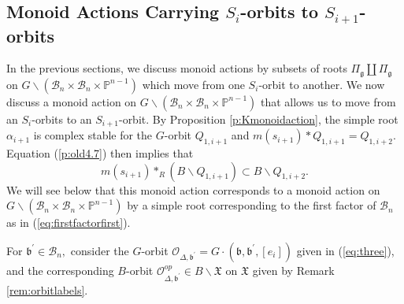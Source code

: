 \documentclass[12pt]{amsart}
\numberwithin{equation}{section}
\newtheorem{rem}[thm]{Remark}
\newcommand{\fg}{\mbox{${\mathfrak g}$}}
\newcommand{\fb}{\mbox{${\mathfrak b}$}}
\newcommand{\B}{\mathcal{B}}
\begin{document}
\subsection{Monoid Actions Carrying $S_{i}$-orbits to $S_{i+1}$-orbits}

In the previous sections, we discuss monoid actions by subsets of roots $\Pi_{\fg}\coprod\Pi_{\fg}$ on $G\backslash(\B_{n}\times\B_{n}\times\mathbb{P}^{n-1})$ which move from one $S_{i}$-orbit to another.
  We now discuss a monoid action on $G\backslash(\B_{n}\times\B_{n}\times\mathbb{P}^{n-1})$ that allows us to move from an $S_{i}$-orbits to an $S_{i+1}$-orbit.
By Proposition \ref{p:Kmonoidaction}, the simple root $\alpha_{i+1}$ is complex stable
for the $G$-orbit $Q_{1,i+1}$ and $m(s_{i+1})*Q_{1,i+1}=Q_{1,i+2}$.  
Equation (\ref{p:old4.7}) then implies that 
\begin{equation}\label{eq:monoidmove}
m(s_{i+1})*_{R}(B\backslash Q_{1,i+1})\subset B\backslash Q_{1,i+2}.  
\end{equation}
We will see below that this monoid action corresponds to a monoid action on $G\backslash (\B_{n}\times\B_{n}\times \mathbb{P}^{n-1})$ by a simple root corresponding to the first factor of $\B_{n}$ as in (\ref{eq:firstfactorfirst}).  

 For $\fb^{\prime} \in \B_n,$ consider the $G$-orbit $\mathcal{O}_{\Delta,\fb^{\prime}}=G\cdot (\fb,\fb^{\prime}, [e_{i}])$ given in (\ref{eq:three}), and the corresponding $B$-orbit $\mathcal{O}_{\Delta,\fb^{\prime}}^{op}\in B\backslash \mathfrak{X}$ on $\mathfrak{X}$ given by Remark \ref{rem:orbitlabels}.

\end{document}
